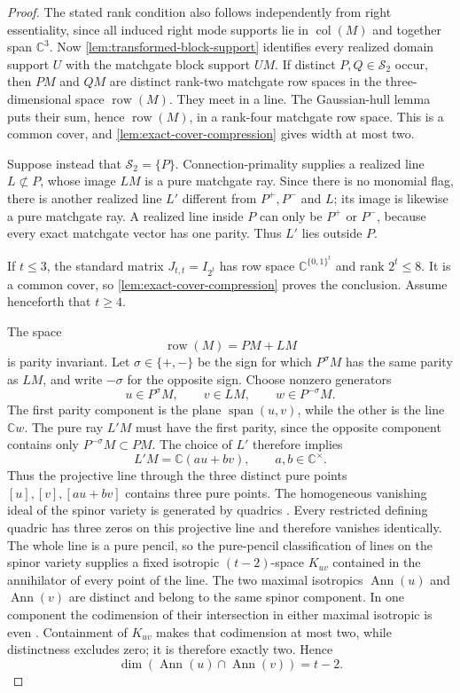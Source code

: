 \documentclass[11pt]{article}
\theoremstyle{definition}
\theoremstyle{remark}
\newcommand{\C}{\mathbb C}
\newcommand{\bits}{\{0,1\}}
\newcommand{\row}{\operatorname{row}}
\newcommand{\Ann}{\operatorname{Ann}}
\newcommand{\Span}{\operatorname{span}}
\begin{document}
\begin{proof}
The stated rank condition also follows independently from right
essentiality, since all induced right mode supports lie in
$\operatorname{col}(M)$ and together span $\C^3$.  Now
\cref{lem:transformed-block-support} identifies every realized domain
support $U$ with the matchgate block support $UM$.  If distinct
$P,Q\in\mathcal S_2$ occur, then $PM$ and $QM$ are distinct rank-two
matchgate row spaces in the three-dimensional space $\row(M)$.  They meet
in a line.  The Gaussian-hull lemma puts their sum, hence $\row(M)$, in a
rank-four matchgate row space.  This is a common cover, and
\cref{lem:exact-cover-compression} gives width at most two.

Suppose instead that $\mathcal S_2=\{P\}$.  Connection-primality supplies a
realized line $L\not\subset P$, whose image $LM$ is a pure matchgate ray.
Since there is no monomial flag, there is another realized line $L'$
different from $P^+,P^-$ and $L$; its image is likewise a pure matchgate
ray.  A realized line inside $P$ can only be $P^+$ or $P^-$, because every
exact matchgate vector has one parity.  Thus $L'$ lies outside $P$.

If $t\le3$, the standard matrix $J_{t,t}=I_{2^t}$ has row space
$\C^{\bits^t}$ and rank $2^t\le8$.  It is a
common cover, so \cref{lem:exact-cover-compression} proves the conclusion.
Assume henceforth that $t\ge4$.

The space
\[
  \row(M)=PM+LM
\]
is parity invariant.  Let $\sigma\in\{+,-\}$ be the sign for which
$P^\sigma M$ has the same parity as $LM$, and write $-\sigma$ for the
opposite sign.  Choose nonzero generators
\[
  u\in P^\sigma M,\qquad v\in LM,\qquad w\in P^{-\sigma}M.
\]
The first parity component is the plane $\Span(u,v)$, while the other is
the line $\C w$.  The pure ray $L'M$ must have the first parity, since the
opposite component contains only $P^{-\sigma}M\subset PM$.  The choice of
$L'$ therefore implies
\[
  L'M=\C(au+bv),
  \qquad a,b\in\C^\times.
\]
Thus the projective line through the three distinct pure points
$[u],[v],[au+bv]$ contains three pure points.  The homogeneous vanishing
ideal of the spinor variety is
generated by quadrics \cite[Section~2.4]{Manivel2009}.  Every restricted defining
quadric has three zeros on this projective line and therefore vanishes
identically.  The whole line is a pure pencil, so the pure-pencil
classification of lines on the spinor variety
\cite[Example~4.12]{LandsbergManivel2003} supplies a fixed isotropic
$(t-2)$-space $K_{uv}$ contained in the annihilator of every point of the
line.  The two maximal isotropics $\Ann(u)$ and $\Ann(v)$ are distinct and
belong to the same spinor component.  In one component the codimension of
their intersection in either maximal isotropic is even
\cite[Section~2.2]{Manivel2009}.  Containment of
$K_{uv}$ makes that codimension at most two, while distinctness excludes
zero; it is therefore exactly two.  Hence
\[
  \dim(\Ann(u)\cap\Ann(v))=t-2.
\]


\end{proof}
\end{document}
